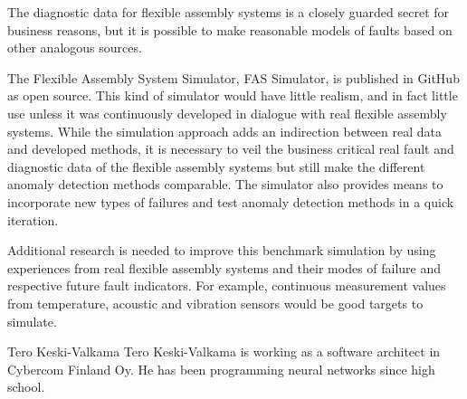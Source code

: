 \documentclass[journal]{IEEEtran}
\begin{document}
The diagnostic data for flexible assembly systems is a closely guarded secret for business reasons, but it is possible to make reasonable models
of faults based on other analogous sources.

The Flexible Assembly System Simulator, FAS Simulator, is published in GitHub \cite{FASSimulator} as open source. This kind of simulator would have
little realism, and in fact little use unless it was continuously developed in dialogue with real flexible assembly systems. While the simulation
approach adds an indirection between real data and developed methods, it is necessary to veil the business critical real fault and diagnostic
data of the flexible assembly systems but still make the different anomaly detection methods comparable. The simulator also provides means to incorporate new types of
failures and test anomaly detection methods in a quick iteration.

Additional research is needed to improve this benchmark simulation by using experiences from real flexible assembly systems and their modes of failure
and respective future fault indicators. For example, continuous measurement values from temperature, acoustic and vibration sensors would be good targets
to simulate.

\appendices




\begin{IEEEbiography}{Tero Keski-Valkama}
Tero Keski-Valkama is working as a software architect in Cybercom Finland Oy. He has been programming neural networks since high school.
\end{IEEEbiography}
\end{document}
